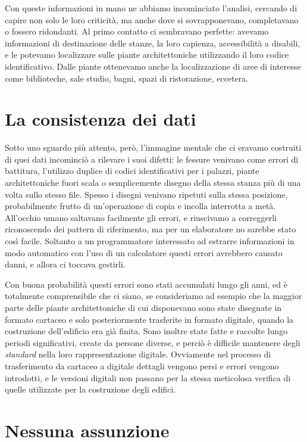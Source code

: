 \documentclass[12pt]{report}
\begin{document}
Con queste informazioni in mano ne abbiamo incominciato l'analisi, cercando di capire non solo le loro criticità, ma anche dove si sovrapponevano, completavano o fossero ridondanti. Al primo contatto ci sembravano perfette: avevamo informazioni di destinazione delle stanze, la loro capienza, accessibilità a disabili, e le potevamo localizzare sulle piante architettoniche utilizzando il loro codice identificativo. Dalle piante ottenevamo anche la localizzazione di aree di interesse come biblioteche, sale studio, bagni, spazi di ristorazione, eccetera.


\section{La consistenza dei dati}

Sotto uno sguardo più attento, però, l'immagine mentale che ci eravamo costruiti di quei dati incominciò a rilevare i suoi difetti: le fessure venivano come errori di battitura, l'utilizzo duplice di codici identificativi per i palazzi, piante architettoniche fuori scala o semplicemente disegno della stessa stanza più di una volta sullo stesso file. Spesso i disegni venivano ripetuti sulla stessa posizione, probabilmente frutto di un'operazione di copia e incolla interrotta a metà. All'occhio umano saltavano facilmente gli errori, e riuscivamo a correggerli riconoscendo dei pattern di riferimento, ma per un elaboratore no sarebbe stato così facile. Soltanto a un programmatore interessato ad estrarre informazioni in modo automatico con l'uso di un calcolatore questi errori avrebbero causato danni, e allora ci toccava gestirli.

Con buona probabilità questi errori sono stati accumulati lungo gli anni, ed è totalmente comprensibile che ci siano, se  consideriamo ad esempio che la maggior parte delle piante architettoniche di cui disponevano sono state disegnate in formato cartaceo e solo posteriormente trasferite in formato digitale, quando la costruzione dell'edificio era già finita. Sono inoltre state fatte e raccolte lungo periodi significativi, create da persone diverse, e perciò è difficile mantenere degli \textit{standard} nella loro rappresentazione digitale. Ovviamente nel processo di trasferimento da cartaceo a digitale dettagli vengono persi e errori vengono introdotti, e le versioni digitali non passano per la stessa meticolosa verifica di quelle utilizzate per la costruzione degli edifici. 

\section*{Nessuna assunzione}
\end{document}
